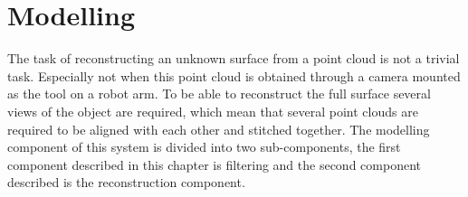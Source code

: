\chapter{Modelling}
The task of reconstructing an unknown surface from a point cloud is not a trivial task. Especially not when this point cloud is obtained through a camera mounted as the tool on a robot arm. To be able to reconstruct the full surface several views of the object are required, which mean that several point clouds are required to be aligned with each other and stitched together. The modelling component of this system is divided into two sub-components, the first component described in this chapter is filtering and the second component described is the reconstruction component. 


